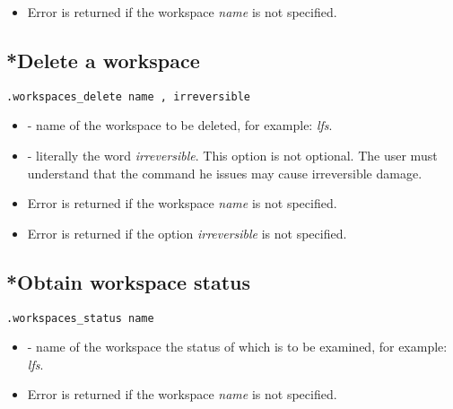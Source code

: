 \errheader
\begin{itemize}
   \item Error  is returned if the workspace \textit{name} is
         not specified.
\end{itemize}


\subsection{*Delete a workspace}

\begin{lstlisting}[style=CommandLineStyle]
.workspaces_delete name , irreversible
\end{lstlisting}

\paramsheader
\begin{itemize}
  \item {} - name of the workspace to be deleted, for example: \textit{lfs}.
  \item {} - literally the word \textit{irreversible}. This
        option is not optional. The user must understand that the command he
        issues may cause irreversible damage.
\end{itemize}

\errheader
\begin{itemize}
   \item Error  is returned if the workspace \textit{name} is
         not specified.
   \item Error  is returned if the option \textit{irreversible} is
         not specified.
\end{itemize}


\subsection{*Obtain workspace status}

\begin{lstlisting}[style=CommandLineStyle]
.workspaces_status name
\end{lstlisting}

\paramsheader
\begin{itemize}
  \item {} - name of the workspace the status of which is to be
        examined, for example: \textit{lfs}.
\end{itemize}

\errheader
\begin{itemize}
   \item Error  is returned if the workspace \textit{name} is
         not specified.
\end{itemize}

